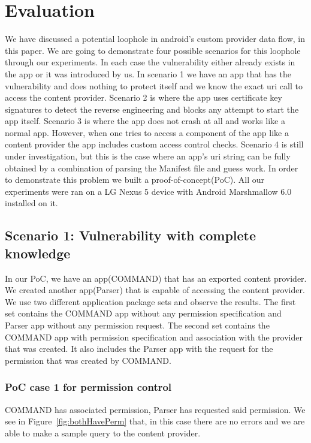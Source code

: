 \section{Evaluation}
\label{eval}
\noindent
We have discussed a potential loophole in android's custom provider data flow, in this paper. We are going to demonstrate four possible scenarios for this loophole through our experiments. In each case the vulnerability either already exists in the app or it was introduced by us. In scenario 1 we have an app that has the vulnerability and does nothing to protect itself and we know the exact uri call to access the content provider. Scenario 2 is where the app uses certificate key signatures to detect the reverse engineering and blocks any attempt to start the app itself. Scenario 3 is where the app does not crash at all and works like a normal app. However, when one tries to access a component of the app like a content provider the app includes custom access control checks. Scenario 4 is still under investigation, but this is the case  where an app's uri string can be fully obtained by a combination of parsing the Manifest file and guess work. In order to demonstrate this problem we built a proof-of-concept(PoC). All our experiments were ran on a LG Nexus 5 device with Android Marshmallow 6.0 installed on it.

\subsection{Scenario 1: Vulnerability with complete knowledge}
In our PoC, we have an app(COMMAND) that has an exported content provider. We created another app(Parser) that is capable of accessing the content provider. We use two different application package sets and observe the results. The first set contains the COMMAND app without any permission specification and Parser app without any permission request. The second set contains the COMMAND app with permission specification and association with the provider that was created. It also includes the Parser app with the request for the permission that was created by COMMAND. 

\subsubsection{PoC case 1 for permission control} COMMAND has associated permission, Parser has requested said permission. We see in Figure~\ref{fig:bothHavePerm} that, in this case there are no errors and we are able to make a sample query to the content provider.
